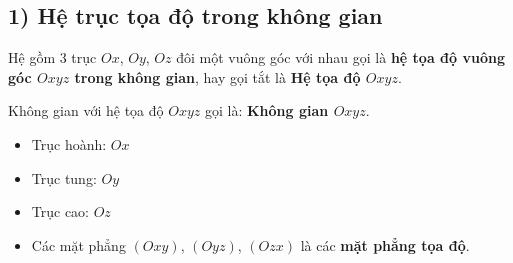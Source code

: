 \documentclass[12pt,a4paper]{extarticle}
\begin{document}
\subsection*{1) Hệ trục tọa độ trong không gian}
\begin{center}
    \begin{minipage}{0.45\textwidth}
        \centering
    \end{minipage}
    \hfill
    \begin{minipage}{0.5\textwidth}
        Hệ gồm 3 trục $Ox$, $Oy$, $Oz$ đôi một vuông góc với nhau gọi là \textbf{hệ tọa độ vuông góc $Oxyz$ trong không gian}, hay gọi tắt là \textbf{Hệ tọa độ $Oxyz$}.
        
        \vspace{0.8em}
        Không gian với hệ tọa độ $Oxyz$ gọi là: \textbf{Không gian $Oxyz$}.
    \end{minipage}
\end{center}
\vspace{1em}
\begin{itemize}[leftmargin=*, label=$\bullet$, itemsep=0.4em]
    \item Trục hoành: $Ox$
    \item Trục tung: $Oy$
    \item Trục cao: $Oz$
    \item Các mặt phẳng $(Oxy)$, $(Oyz)$, $(Ozx)$ là các \textbf{mặt phẳng tọa độ}.
\end{itemize}
\vspace{1.5em}
\end{document}
